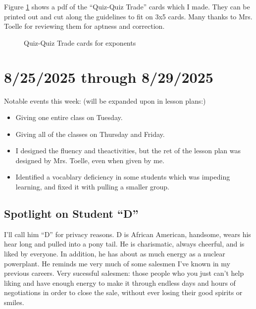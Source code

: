 \documentclass[11pt]{elegantbook}
\begin{document}
Figure \ref{qqt_ex} shows a pdf of the ``Quiz-Quiz Trade'' cards which I made.
They can be printed out and cut along the guidelines to fit on 3x5
cards.  Many thanks to Mrs. Toelle for reviewing them for aptness and
correction.

\begin{figure}[h]
  \begin{minipage}[t]{5in}
    
    \caption{Quiz-Quiz Trade cards for exponents}
  \end{minipage}
  \label{qqt_ex}
\end{figure}
  







\chapter{8/25/2025 through 8/29/2025}

Notable events this week: (will be expanded upon in lesson plans:)

\begin{itemize}
  
\item Giving one entire class on Tuesday.
  
\item Giving all of the classes on Thursday and Friday.
  
\item I designed the fluency and theactivities, but the ret of the
  lesson plan was designed by Mrs. Toelle, even when given by me.
  
\item Identified a vocablary deficiency in some students which was
  impeding learning, and fixed it with pulling a smaller group.
  
\end{itemize}

\section{Spotlight on Student ``D''}

I'll call him ``D'' for privacy reasons.  D is African American,
handsome, wears his hear long and pulled into a pony tail.  He is
charismatic, always cheerful, and is liked by everyone.  In addition,
he has about as much energy as a nuclear powerplant.  He reminds me
very much of some salesmen I've known in my previous careers.  Very
sucessful salesmen: those people who you just can't help liking and
have enough energy to make it through endless days and hours of
negotiations in order to close the sale, without ever losing their
good spirits or smiles.
\end{document}
